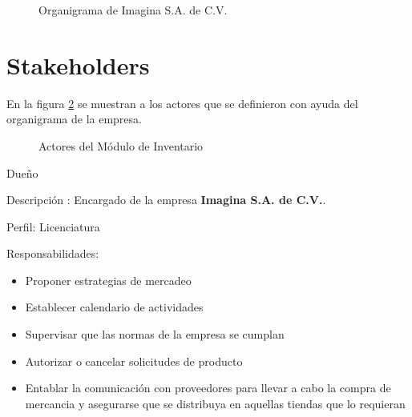 \begin{figure}[hbtp!]
	\begin{center}	
		\label{fig:Organigrama}
		\caption{Organigrama de Imagina S.A. de C.V.}
	\end{center}
\end{figure}


\section{Stakeholders}

En la figura \ref{fig:Stake} se muestran a los actores que se definieron con ayuda del organigrama de la empresa.

\begin{figure}[hbtp!]
	\begin{center}	
		\label{fig:Stake}
		\caption{Actores del Módulo de Inventario}
	\end{center}
\end{figure}


\begin{Stakeholder}{Dueño}
\item[Descripción]: Encargado de la empresa \textbf{Imagina S.A. de C.V.}.

        \item[Perfil:] Licenciatura
        \item[Responsabilidades:] \hspace{1em}
        \begin{itemize}
        	\item Proponer estrategias de mercadeo
		\item Establecer calendario de actividades
		\item Supervisar que las normas de la empresa se cumplan
		\item Autorizar o cancelar solicitudes de producto
		\item Entablar la comunicación con proveedores para llevar a cabo la compra de mercancia y asegurarse que se distribuya en aquellas tiendas que lo requieran
        \end{itemize}
        
\end{Stakeholder}

